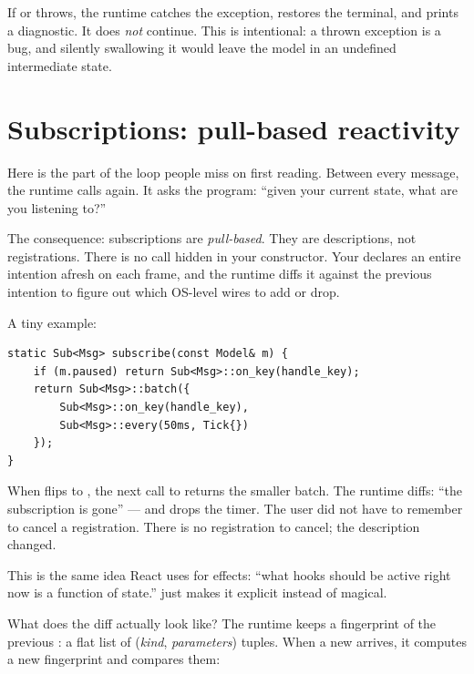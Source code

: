 \begin{warning}
If  or  throws, the runtime catches the
exception, restores the terminal, and prints a diagnostic. It does
\emph{not} continue. This is intentional: a thrown exception is a
bug, and silently swallowing it would leave the model in an
undefined intermediate state.
\end{warning}

\section{Subscriptions: pull-based reactivity}

Here is the part of the loop people miss on first reading. Between
every message, the runtime calls  again.
It asks the program: ``given your current state, what are you
listening to?''

The consequence: subscriptions are \emph{pull-based}. They are
descriptions, not registrations. There is no
 call hidden in your constructor. Your
 declares an entire intention afresh on each
frame, and the runtime diffs it against the previous intention to
figure out which OS-level wires to add or drop.

A tiny example:

\begin{lstlisting}
static Sub<Msg> subscribe(const Model& m) {
    if (m.paused) return Sub<Msg>::on_key(handle_key);
    return Sub<Msg>::batch({
        Sub<Msg>::on_key(handle_key),
        Sub<Msg>::every(50ms, Tick{})
    });
}
\end{lstlisting}

When  flips to , the next call to
 returns the smaller batch. The runtime diffs:
``the  subscription is gone'' --- and drops the
timer. The user did not have to remember to cancel a
registration. There is no registration to cancel; the description
changed.

\begin{idea}
This is the same idea React uses for effects: ``what hooks should
be active right now is a function of state.'' \maya{} just makes
it explicit instead of magical.
\end{idea}

What does the diff actually look like? The runtime keeps a
fingerprint of the previous : a flat list of
(\emph{kind}, \emph{parameters}) tuples. When a new 
arrives, it computes a new fingerprint and compares them:


